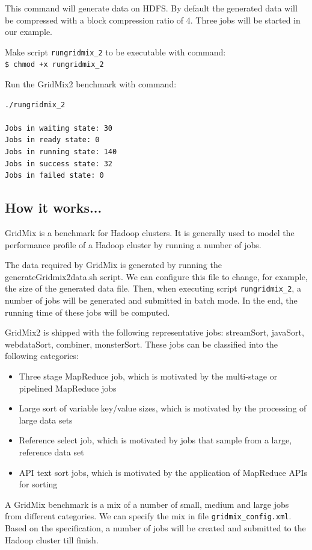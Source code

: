 \begin{info}
This command will generate data on HDFS. By default the generated data will be compressed with a block compression ratio of 4. Three jobs will be started in our example.
\end{info}

Make script \verb|rungridmix_2| to be executable with command: \\
\verb|$ chmod +x rungridmix_2|

Run the GridMix2 benchmark with command:
\lstset{style=bashstyle}
\begin{lstlisting}
./rungridmix_2

Jobs in waiting state: 30
Jobs in ready state: 0
Jobs in running state: 140
Jobs in success state: 32
Jobs in failed state: 0
\end{lstlisting}

\subsection*{How it works...}
GridMix is a benchmark for Hadoop clusters. It is generally used to model the performance profile of a Hadoop cluster by running a number of jobs.

The data required by GridMix is generated by running the generateGridmix2data.sh script. We can configure this file to change, for example, the size of the generated data file. Then, when executing script \verb|rungridmix_2|, a number of jobs will be generated and submitted in batch mode. In the end, the running time of these jobs will be computed.

GridMix2 is shipped with the following representative jobs: streamSort, javaSort, webdataSort, combiner, monsterSort. These jobs can be classified into the following categories:
\begin{itemize}
  \item Three stage MapReduce job, which is motivated by the multi-stage or pipelined MapReduce jobs
  \item Large sort of variable key/value sizes, which is motivated by the processing of large data sets
  \item Reference select job, which is motivated by jobs that sample from a large, reference data set
  \item API text sort jobs, which is motivated by the application of MapReduce APIs for sorting
\end{itemize}
A GridMix benchmark is a mix of a number of small, medium and large jobs from different categories. We can specify the mix in file \verb|gridmix_config.xml|. Based on the specification, a number of jobs will be created and submitted to the Hadoop cluster till finish.
